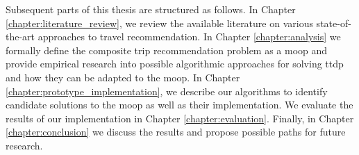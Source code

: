 Subsequent parts of this thesis are structured as follows. In Chapter \ref{chapter:literature_review}, we review the available literature on various state-of-the-art approaches to travel recommendation. In Chapter \ref{chapter:analysis} we formally define the composite trip recommendation problem as a \gls{moop} and provide empirical research into possible algorithmic approaches for solving \gls{ttdp} and how they can be adapted to the \gls{moop}. In Chapter \ref{chapter:prototype_implementation}, we describe our algorithms to identify candidate solutions to the \gls{moop} as well as their implementation. We evaluate the results of our implementation in Chapter \ref{chapter:evaluation}. Finally, in Chapter \ref{chapter:conclusion} we discuss the results and propose possible paths for future research. 




